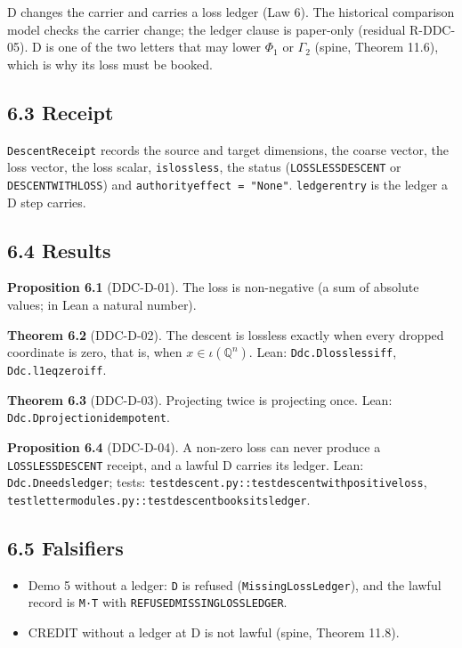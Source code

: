 \documentclass[
  11pt,
]{article}
\providecommand{\tightlist}{%
  \setlength{\itemsep}{0pt}\setlength{\parskip}{0pt}}
\renewcommand{\_}{\ddcunderscore\allowbreak}
\begin{document}
D changes the carrier and carries a loss ledger (Law 6). The historical
comparison model checks the carrier change; the ledger clause is
paper-only (residual R-DDC-05). D is one of the two letters that may
lower \(\Phi_1\) or \(\Gamma_2\) (spine, Theorem 11.6), which is why its
loss must be booked.

\subsection{6.3 Receipt}\label{receipt-5}

\texttt{Descent\allowbreak Receipt} records the source and target dimensions, the
coarse vector, the loss vector, the loss scalar, \texttt{is\_lossless},
the status (\texttt{LOSSLESS\_DESCENT} or \texttt{DESCENT\_WITH\_LOSS})
and \texttt{authority\_effect\ =\ "None"}. \texttt{ledger\_entry} is the
ledger a D step carries.

\subsection{6.4 Results}\label{results-5}

\textbf{Proposition 6.1} (DDC-D-01). The loss is non-negative (a sum of
absolute values; in Lean a natural number).

\textbf{Theorem 6.2} (DDC-D-02). The descent is lossless exactly when
every dropped coordinate is zero, that is, when
\(x \in \iota(\mathbb{Q}^n)\). Lean: \texttt{Ddc.\allowbreak D\_lossless\_iff},
\texttt{Ddc.\allowbreak l1\_eq\_zero\_iff}.

\textbf{Theorem 6.3} (DDC-D-03). Projecting twice is projecting once.
Lean: \texttt{Ddc.\allowbreak D\_projection\_idempotent}.

\textbf{Proposition 6.4} (DDC-D-04). A non-zero loss can never produce a
\texttt{LOSSLESS\_DESCENT} receipt, and a lawful D carries its ledger.
Lean: \texttt{Ddc.\allowbreak D\_needs\_ledger}; tests:
\texttt{test\_descent.\allowbreak py::test\_descent\_with\_positive\_loss},
\texttt{test\_letter\_modules.\allowbreak py::test\_descent\_books\_its\_ledger}.

\subsection{6.5 Falsifiers}\label{falsifiers-5}

\begin{itemize}
\tightlist
\item
  Demo 5 without a ledger: \texttt{D} is refused
  (\texttt{Missing\allowbreak Loss\allowbreak Ledger}), and the lawful record is \texttt{M·T}
  with \texttt{REFUSED\_MISSING\_LOSS\_LEDGER}.
\item
  CREDIT without a ledger at D is not lawful (spine, Theorem 11.8).
\end{itemize}
\end{document}
